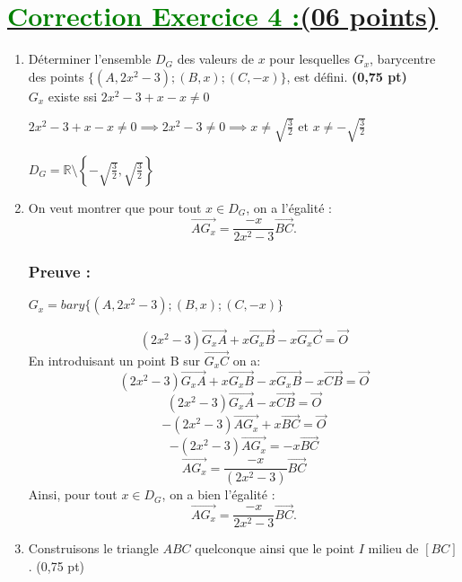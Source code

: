 \documentclass[12pt,a4paper]{article}
\begin{document}
\section*{\underline{\textcolor{green}{Correction Exercice 4 :}(06 points)}}
\begin{enumerate}
    \item Déterminer l’ensemble $D_G$ des valeurs de $x$ pour lesquelles $G_x$, barycentre\\ des points $\{(A, 2x^2 - 3); (B, x); (C, -x)\}$, est défini. \hfill \textbf{(0,75 pt)}\\
    $G_x$ existe ssi $2x^2 - 3+x-x \neq 0$
    
    $2x^2 - 3+x-x \neq 0 \implies 2x^2 - 3\neq 0  \implies  x\neq \sqrt{\frac{3}{2}} \text{ et } x\neq- \sqrt{\frac{3}{2}}$
    
    $D_G = \mathbb{R}\setminus \left\lbrace -\sqrt{\frac{3}{2}},\sqrt{\frac{3}{2}} \right\rbrace $

\item On veut montrer que pour tout \( x \in D_G \), on a l'égalité :
\[
\overrightarrow{AG_x} = \frac{-x}{2x^2 - 3} \overrightarrow{BC}.
\]

\subsubsection*{Preuve :}
$G_x=bary\{(A, 2x^2 - 3); (B, x); (C, -x)\}$

\[
(2x^2 - 3)\overrightarrow{G_xA}+x\overrightarrow{G_xB}-x\overrightarrow{G_xC}=\overrightarrow{O}
\]
En introduisant un point B sur $\overrightarrow{G_xC}$ on a:
\[
(2x^2 - 3)\overrightarrow{G_xA}+x\overrightarrow{G_xB}-x\overrightarrow{G_xB}-x\overrightarrow{CB}=\overrightarrow{O}
\]
\[
(2x^2 - 3)\overrightarrow{G_xA}-x\overrightarrow{CB}=\overrightarrow{O}
\]
\[
-(2x^2 - 3)\overrightarrow{AG_x}+x\overrightarrow{BC}=\overrightarrow{O}
\]
\[
-(2x^2 - 3)\overrightarrow{AG_x}=-x\overrightarrow{BC}
\]
\[
\overrightarrow{AG_x}=\frac{-x}{(2x^2 - 3)}\overrightarrow{BC}
\]
Ainsi, pour tout \( x \in D_G \), on a bien l'égalité :
\[
\overrightarrow{AG_x} = \frac{-x}{2x^2 - 3} \overrightarrow{BC}.
\]
\item Construisons le triangle $ABC$ quelconque ainsi que le point $I$ milieu de $[BC]$. \hfill (0,75 pt) 
\begin{center}
\end{center}
\end{enumerate}
\end{document}
